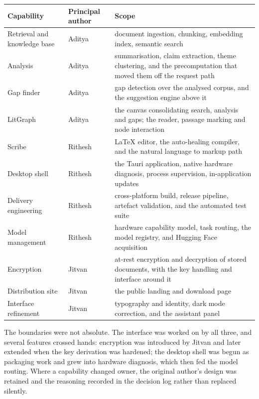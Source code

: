 \documentclass[11pt,a4paper]{article}
\begin{document}
\begin{center}
\small
\begin{tabularx}{\linewidth}{@{}llX@{}}
\toprule
\textbf{Capability} & \textbf{Principal author} & \textbf{Scope} \\
\midrule
Retrieval and knowledge base & Aditya & document ingestion, chunking, embedding
index, semantic search \\
Analysis & Aditya & summarisation, claim extraction, theme clustering, and the
precomputation that moved them off the request path \\
Gap finder & Aditya & gap detection over the analysed corpus, and the
suggestion engine above it \\
LitGraph & Aditya & the canvas consolidating search, analysis and gaps; the
reader, passage marking and node interaction \\
\midrule
Scribe & Rithesh & LaTeX editor, the auto-healing compiler, and the natural
language to markup path \\
Desktop shell & Rithesh & the Tauri application, native hardware diagnosis,
process supervision, in-application updates \\
Delivery engineering & Rithesh & cross-platform build, release pipeline,
artefact validation, and the automated test suite \\
Model management & Rithesh & hardware capability model, task routing, the
model registry, and Hugging Face acquisition \\
\midrule
Encryption & Jitvan & at-rest encryption and decryption of stored documents,
with the key handling and interface around it \\
Distribution site & Jitvan & the public landing and download page \\
Interface refinement & Jitvan & typography and identity, dark mode correction,
and the assistant panel \\
\bottomrule
\end{tabularx}
\end{center}

The boundaries were not absolute. The interface was worked on by all three, and
several features crossed hands: encryption was introduced by Jitvan and later
extended when the key derivation was hardened; the desktop shell was begun as
packaging work and grew into hardware diagnosis, which then fed the model
routing. Where a capability changed owner, the original author's design was
retained and the reasoning recorded in the decision log rather than replaced
silently.
\end{document}
